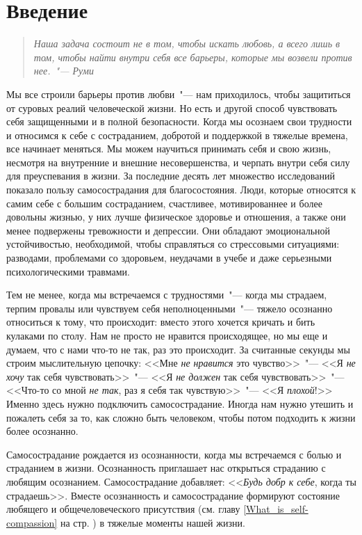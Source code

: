 
\section*{Введение} \label{Introduction}

\begin{quote}
	\textit{Наша задача состоит не в том, чтобы искать любовь, а всего лишь в том, чтобы найти внутри себя все барьеры, которые мы возвели против нее.~"--- Руми}
\end{quote}
	
	Мы все строили барьеры против любви~"--- нам приходилось, чтобы защититься от суровых реалий человеческой жизни. Но есть и другой способ чувствовать себя защищенными и в полной безопасности. Когда мы осознаем свои трудности и относимся к себе с состраданием, добротой и поддержкой в тяжелые времена, все начинает меняться. Мы можем научиться принимать себя и свою жизнь, несмотря на внутренние и внешние несовершенства, и черпать внутри себя силу для преуспевания в жизни. За последние десять лет множество исследований показало пользу самосострадания для благосостояния. Люди, которые относятся к самим себе с большим состраданием, счастливее, мотивированнее и более довольны жизнью, у них лучше физическое здоровье и отношения, а также они менее подвержены тревожности и депрессии. Они обладают эмоциональной устойчивостью, необходимой, чтобы справляться со стрессовыми ситуациями: разводами, проблемами со здоровьем, неудачами в учебе и даже серьезными психологическими травмами. 
	
	Тем не менее, когда мы встречаемся с трудностями~"--- когда мы страдаем, терпим провалы или чувствуем себя неполноценными~"--- тяжело осознанно относиться к тому, что происходит: вместо этого хочется кричать и бить кулаками по столу. Нам не просто не нравится происходящее, но мы еще и думаем, что с нами что-то не так, раз это происходит. За считанные секунды мы строим мыслительную цепочку: <<Мне \emph{не нравится} это чувство>>~"--- <<Я \emph{не хочу} так себя чувствовать>>~"--- <<Я \emph{не должен} так себя чувствовать>>~"--- <<Что-то со мной \emph{не так}, раз я себя так чувствую>>~"--- <<Я \emph{плохой}!>> Именно здесь нужно подключить самосострадание. Иногда нам нужно утешить и пожалеть себя за то, как сложно быть человеком, чтобы потом подходить к жизни более осознанно. 
	
	Самосострадание рождается из осознанности, когда мы встречаемся с болью и страданием в жизни. Осознанность приглашает нас открыться страданию с любящим осознанием. Самосострадание добавляет: <<\emph{Будь добр к себе}, когда ты страдаешь>>. Вместе осознанность и самосострадание формируют состояние любящего и общечеловеческого присутствия (см. главу \ref{What_is_self-compassion} на стр. \pageref{What_is_self-compassion}) в тяжелые моменты нашей жизни. 
	
